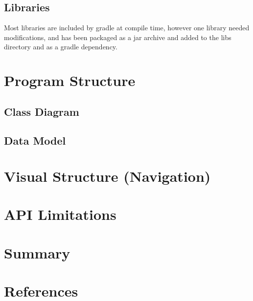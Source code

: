 \documentclass[11pt,english,numbers=endperiod,parskip=half]{scrartcl}
\begin{document}
  \subsection{Libraries}
  Most libraries are included by gradle at compile time, however one library
  needed modifications, and has been packaged as a jar archive and added
  to the libs directory and as a gradle dependency.

\section{Program Structure}
  \subsection{Class Diagram}
  \subsection{Data Model}

\section{Visual Structure (Navigation)}

\section{API Limitations}

\section{Summary}
\section{References}
\end{document}
